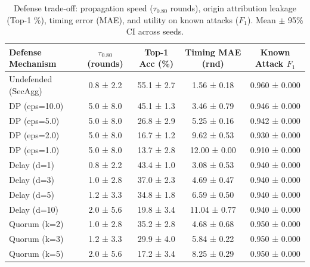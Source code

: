 \begin{table}[t]
\centering
\small
\caption{Defense trade-off: propagation speed ($\tau_{0.80}$ rounds), origin attribution leakage (Top-1 \%), timing error (MAE), and utility on known attacks ($F_1$). Mean $\pm$ 95\% CI across seeds.}
\label{tab:defenses}
\begin{tabular}{lcccc}
\toprule
Defense Mechanism & $\tau_{0.80}$ (rounds) & Top-1 Acc (\%) & Timing MAE (rnd) & Known Attack $F_1$ \\
\midrule
Undefended (SecAgg) & 0.8 ± 2.2 & 55.1 ± 2.7 & 1.56 ± 0.18 & 0.960 ± 0.000 \\
DP (eps=10.0) & 5.0 ± 8.0 & 45.1 ± 1.3 & 3.46 ± 0.79 & 0.946 ± 0.000 \\
DP (eps=5.0) & 5.0 ± 8.0 & 26.8 ± 2.9 & 5.25 ± 0.16 & 0.942 ± 0.000 \\
DP (eps=2.0) & 5.0 ± 8.0 & 16.7 ± 1.2 & 9.62 ± 0.53 & 0.930 ± 0.000 \\
DP (eps=1.0) & 5.0 ± 8.0 & 13.7 ± 2.8 & 12.00 ± 0.00 & 0.910 ± 0.000 \\
Delay (d=1) & 0.8 ± 2.2 & 43.4 ± 1.0 & 3.08 ± 0.53 & 0.940 ± 0.000 \\
Delay (d=3) & 1.0 ± 2.8 & 37.0 ± 2.3 & 4.69 ± 0.47 & 0.940 ± 0.000 \\
Delay (d=5) & 1.2 ± 3.3 & 34.8 ± 1.8 & 6.59 ± 0.50 & 0.940 ± 0.000 \\
Delay (d=10) & 2.0 ± 5.6 & 19.8 ± 3.4 & 11.04 ± 0.77 & 0.940 ± 0.000 \\
Quorum (k=2) & 1.0 ± 2.8 & 35.2 ± 2.8 & 4.68 ± 0.68 & 0.950 ± 0.000 \\
Quorum (k=3) & 1.2 ± 3.3 & 29.9 ± 4.0 & 5.84 ± 0.22 & 0.950 ± 0.000 \\
Quorum (k=5) & 2.0 ± 5.6 & 17.2 ± 3.4 & 8.25 ± 0.29 & 0.950 ± 0.000 \\
\bottomrule
\end{tabular}
\end{table}
